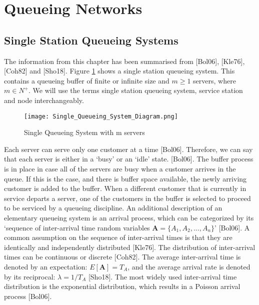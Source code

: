 \documentclass[a4paper,11pt,titlepage]{article}
\begin{document}
\section{Queueing Networks}

\subsection{Single Station Queueing Systems}

The information from this chapter has been summarised from [Bol06], [Kle76], [Coh82] and [Sho18]. Figure \ref{fig:simplequeue} shows a single station queueing system. This contains a queueing buffer of finite or infinite size and $m \geq 1$ servers, where  $m \in N^+$. We will use the terms single station queueing system, service station and node interchangeably.

\begin{figure}[h!]
\begin{center}
\texttt{[image: Single\_Queueing\_System\_Diagram.png]}
\caption{Single Queueing System with m servers}
\label{fig:simplequeue}
\end{center}
\end{figure}

Each server can serve only one customer at a time [Bol06]. Therefore, we can say that each server is either in a `busy' or an `idle' state. [Bol06]. The buffer process is in place in case all of the servers are busy when a customer arrives in the queue. If this is the case, and there is buffer space available, the newly arriving customer is added to the buffer. When a different customer that is currently in service departs a server, one of the customers in the buffer is selected to proceed to be serviced by a queueing discipline. An additional description of an elementary queueing system is an arrival process, which can be categorized by its `sequence of inter-arrival time random variables $\mathbf{A} = \{A_1, A_2, ... , A_n \}$' [Bol06]. A common assumption on the sequence of inter-arrival times is that they are identically and independently distributed [Kle76]. The distribution of inter-arrival times can be continuous or discrete [Coh82]. The average inter-arrival time is denoted by an expectation: $E[\mathbf{A}] = T_A$, and the average arrival rate is denoted by its reciprocal: $\lambda = 1/T_A$ [Sho18]. The most widely used inter-arrival time distribution is the exponential distribution, which results in a Poisson arrival process [Bol06]. \\
\end{document}
